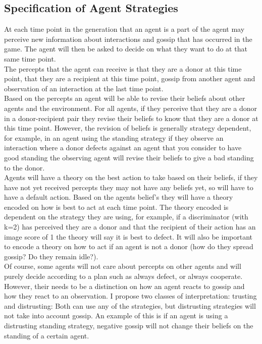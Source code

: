 \documentclass[twoside,twocolumn]{article}
\begin{document}
\subsection{Specification of Agent Strategies}
At each time point in the generation that an agent is a part of the agent may perceive new information about interactions and gossip that has occurred in the game. The agent will then be asked to decide on what they want to do at that same time point.\\
The percepts that the agent can receive is that they are a donor at this time point, that they are a recipient at this time point, gossip from another agent and observation of an interaction at the last time point.\\
Based on the percepts an agent will be able to revise their beliefs about other agents and the environment. For all agents, if they perceive that they are a donor in a donor-recipient pair they revise their beliefs to know that they are a donor at this time point. However, the revision of beliefs is generally strategy dependent, for example, in an agent using the standing strategy if they observe an interaction where a donor defects against an agent that you consider to have good standing the observing agent will revise their beliefs to give a bad standing to the donor.\\
Agents will have a theory on the best action to take based on their beliefs, if they have not yet received percepts they may not have any beliefs yet, so will have to have a default action. Based on the agents belief's they will have a theory encoded on how is best to act at each time point. The theory encoded is dependent on the strategy they are using, for example, if a discriminator (with k=2) has perceived they are a donor and that the recipient of their action has an image score of 1 the theory will say it is best to defect. It will also be important to encode a theory on how to act if an agent is not a donor (how do they spread gossip? Do they remain idle?).\\
Of course, some agents will not care about percepts on other agents and will purely decide according to a plan such as always defect, or always cooperate. However, their needs to be a distinction on how an agent reacts to gossip and how they react to an observation. I propose two classes of interpretation: trusting and distrusting: Both can use any of the strategies, but distrusting strategies will not take into account gossip. An example of this is if an agent is using a distrusting standing strategy, negative gossip will not change their beliefs on the standing of a certain agent.\\
\end{document}
